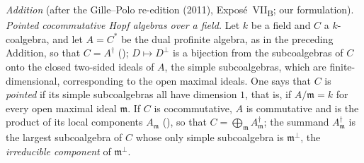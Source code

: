 
\par\medskip\noindent{}%
\emph{Addition} (after the Gille--Polo re-edition (2011),
Expos\'e~VII\textsubscript{B}; our formulation). \emph{Pointed cocommutative
Hopf algebras over a field.} Let \(k\) be a field and \(C\) a \(k\)-coalgebra,
and let \(A=C^*\) be the dual profinite algebra, as in the preceding
Addition, so that \(C=A^\dagger\) \textup{()}; \(D\mapsto D^\perp\) is a bijection
from the subcoalgebras of \(C\) onto the closed two-sided ideals of \(A\),
the simple subcoalgebras, which are finite-dimensional, corresponding to
the open maximal ideals. One says that \(C\) is \emph{pointed} if its
simple subcoalgebras all have dimension \(1\), that is, if
\(A/\mathfrak m=k\) for every open maximal ideal \(\mathfrak m\). If \(C\) is
cocommutative, \(A\) is commutative and is the product of its local
components \(A_{\mathfrak m}\) \textup{()}, so that
\(C=\bigoplus_{\mathfrak m}A_{\mathfrak m}^\dagger\); the summand
\(A_{\mathfrak m}^\dagger\) is the largest subcoalgebra of \(C\) whose only
simple subcoalgebra is \(\mathfrak m^\perp\), the \emph{irreducible component}
of \(\mathfrak m^\perp\).

